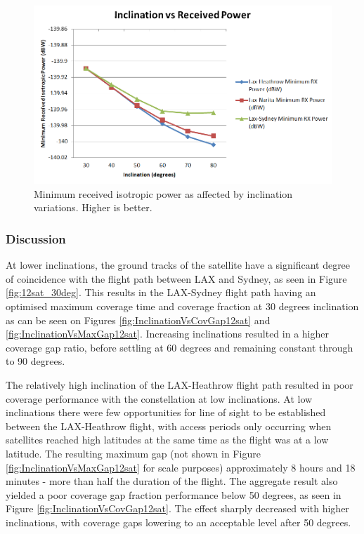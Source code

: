 \begin{figure}[htbp]
	\centering
	\includegraphics[scale = 0.6]{Pictures/InclinationVsRxPower12sat.png}
	
	\caption{Minimum received isotropic power as affected by inclination variations. Higher is better.}
	\label{fig:InclinationVsRxPower12sat}
\end{figure}
\subsubsection{Discussion}
At lower inclinations, the ground tracks of the satellite have a significant degree of coincidence with the flight path between LAX and Sydney, as seen in Figure \ref{fig:12sat_30deg}. This results in the LAX-Sydney flight path having an optimised maximum coverage time and coverage fraction at 30 degrees inclination as can be seen on Figures \ref{fig:InclinationVsCovGap12sat} and \ref{fig:InclinationVsMaxGap12sat}. Increasing inclinations resulted in a higher coverage gap ratio, before settling at 60 degrees and remaining constant through to 90 degrees.

The relatively high inclination of the LAX-Heathrow flight path resulted in poor coverage performance with the constellation at low inclinations. At low inclinations there were few opportunities for line of sight to be established between the LAX-Heathrow flight, with access periods only occurring when satellites reached high latitudes at the same time as the flight was at a low latitude. The resulting maximum gap (not shown in Figure \ref{fig:InclinationVsMaxGap12sat} for scale purposes) approximately 8 hours and 18 minutes - more than half the duration of the flight. The aggregate result also yielded a poor coverage gap fraction performance below 50 degrees, as seen in Figure \ref{fig:InclinationVsCovGap12sat}. The effect sharply decreased with higher inclinations, with coverage gaps lowering to an acceptable level after 50 degrees.

